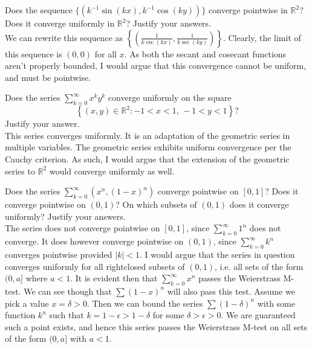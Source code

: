 \documentclass[12pt]{book}
\newcommand{\R}{\mathbb{R}}
\newenvironment{exercise}[2][Exercise]{\begin{trivlist}
\item[\hskip \labelsep {\bfseries #1}\hskip \labelsep {\bfseries #2.}]}{\end{trivlist}}
\begin{document}
\begin{exercise}{8.3.3}
Does the sequence $\{ \left( k^{-1} \sin(kx), k^{-1} \cos(ky)  \right)\} $ converge pointwise in $\R^2$? Does it converge uniformly in $\R^2$? Justify your answers. \\

We can rewrite this sequence as $\left\{ \left( \frac{1}{k \csc(k x)}, \frac{1}{k \sec(k y)}  \right) \right\}$. Clearly, the limit of this sequence is $(0,0)$ for all $x$. As both the secant and cosecant functions aren't properly bounded, I would argue that this convergence cannot be uniform, and must be pointwise.
\end{exercise}




\begin{exercise}{8.3.8}
Does the series $\sum_{k=0}^\infty x^k y^k $ converge uniformly on the square 
    \[ \left\{ (x,y) \in \R^2 : -1 < x <1,\,  -1 < y < 1   \right\}?\]
Justify your answer. \\

This series converges uniformly. It is an adaptation of the geometric series in multiple variables. The geometric series exhibits uniform convergence per the Cauchy criterion. As such, I would argue that the extension of the geometric series to $\R^2$ would converge uniformly as well.
\end{exercise}




\begin{exercise}{8.3.10}
Does the series $\sum_{k=0}^\infty \left( x^n, (1-x)^n \right)$ converge pointwise on $[0,1]$? Does it converge pointwise on $(0,1)$? On which subsets of $(0,1)$ does it converge uniformly? Justify your answers. \\

The series does not converge pointwise on $[0,1]$, since $\sum_{k=0}^\infty 1^n$ does not converge. It does however converge pointwise on $(0,1)$, since $\sum_{k=0}^\infty k^n$ converges pointwise provided $|k| < 1$. I would argue that the series in question converges uniformly for all rightclosed subsets of $(0,1)$, i.e. all sets of the form $(0,a]$ where $a<1$. It is evident then that $\sum_{k=0}^\infty x^n$ passes the Weierstrass M-test. We can see though that $\sum (1-x)^n$ will also pass this test. Assume we pick a value $x = \delta>0$. Then we can bound the series $\sum (1- \delta)^n$ with some function $k^n$ such that $k = 1 - \epsilon > 1 - \delta$ for some $\delta > \epsilon > 0$. We are guaranteed such a point exists, and hence this series passes the Weierstrass M-test on all sets of the form $(0,a]$ with $a<1$.
\end{exercise}
\end{document}
